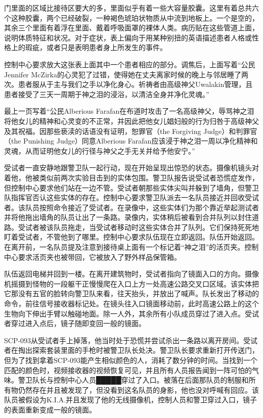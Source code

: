 \begin{scpbox}
门里面的区域比接待区要大的多，里面似乎有着一些大容量胶囊。这里有着总共六个这种胶囊，两个已经破裂，一种褐色琥珀状物质从中流到地板上。一个是空的，其余三个里面有着浮在里面、戴着呼吸面罩的裸体人类。病历贴在这些管道上面，说明体质特征和状况。对于症状，表上偏向于用某种别扭的英语描述患者人格或性格上的瑕疵，或者只是表明患者身上所发生的事件。

控制中心要求放大这张表上面其中一个患者相应的部分。调焦后，上面写着“公民Jennifer McZirka的心灵犯了过错，使得她在丈夫离家时候的晚上与邻居睡了两次。患者服从于主与我们之手以净化身心。祈祷者由高级神父Uwalakin管理，且患者接受了三天一周期于神之泪的浸浴，以清洁全身并净化灵魂。”

最上一页写着“公民Alberious Farafan在布道时攻击了一名高级神父，辱骂神之泪将他女儿的精神和心灵变的不正常，并因此把他女儿娼妇般的行为归咎于高级神父及其祝福。因那些亵渎的话语没有证明，恕罪官（the Forgiving Judge）和判罪官（the Punishing Judge）同意Alberious Farafan应该浸于神之泪一周以净化精神和灵魂，从而证明他女儿的行径与神父之手无关并给予他安宁。”

受试者一直安静地跟警卫队一起行动，现在开始呈现出惊恐的状态。摄像机镜头对着他，他被类似前两次实验目击到的实体包围。警卫队报告说受试者恐慌症发作，但控制中心要求他们站在一边不管。受试者朝那些实体尖叫并躲到了墙角，但警卫队指挥官否认这些实体的存在。控制中心要求警卫队派去一名队员接近并回收受试者。该队员按照命令接近了受试者。在录像中，这些实体们为那个靠近举起测试者并将他拖出墙角的队员让出了一条路。录像内，实体稍后被看到合并队列以封住道路。受试者被该队员拖走，当受试者移动时这些实体合并了队列。它们保持死死地盯着受试者，不管他到了哪里。控制中心要求队伍现在立即返回。队伍开始返回。在离开前，一名队员提及注意到接待桌上面有一个标记着“神之泪”的活页夹。控制中心要求活页夹也被带回，它被放入了野外样品保管箱。

队伍返回电梯并回到一楼。在离开建筑物时，受试者指向了镜面入口的方向。摄像机摇摄到怪物的一段躯干正慢慢爬在入口上方一处高速公路交叉口区域。该实体把它那没有五官的脸转向警卫队来看，往天抬头，并放出了喊声。队长发出了移动的命令，前往信号接收器标记处。在镜头往入口镜面移动前，此时高速公路上的这个生物向下伸出手臂以触碰地面。除一人外，其余所有小队成员穿过了进入点。受试者穿过进入点后，镜子随即变回一般的镜面。

SCP-093从受试者手上掉落，他当时处于恐慌并尝试杀出一条路以离开房间。受试者在掏出探索套装里面的手枪时被警卫队长处决。警卫队长要求重新打开传送门，但为了找到拿着SCP-093能产生相似颜色的人，消耗了数分钟的时间。当找到一个匹配的颜色时，视频接收器的视频恢复可见，并且所有人员报告闻到一阵可怕的气味。警卫队长与控制中心人员█████穿过了入口。被落在后面那队员的制服和所有物仍然存在并且被发现了，但没看到这名队员的身影，他也没对呼喊有回应。该队员被假设为K.I.A.并且发现了他的无线摄像机，控制人员和警卫穿过入口，镜子的表面重新变成一般的镜面。


\end{scpbox}
